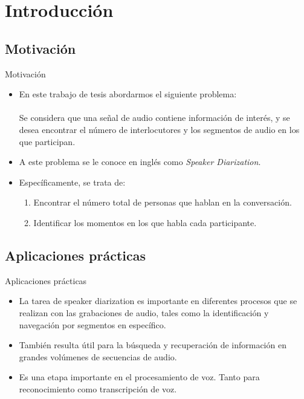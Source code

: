 

\section{Introducción}

\subsection{Motivación}
\begin{frame}{Motivación}

\begin{itemize}
    \itemsep1em
    \item En este trabajo de tesis abordarmos el siguiente problema: \\~\\
    \hspace{2em} Se considera que una señal de audio contiene información de interés, y se desea encontrar el número de interlocutores y los segmentos de audio en los que participan.

    \item A este problema se le conoce en inglés como \alert{\textit{Speaker Diarization}}.

    \item Específicamente, se trata de: 
    \begin{enumerate}
      \itemsep0.8em
        \item Encontrar el número total de personas que hablan en la conversación.
        \item Identificar los momentos en los que habla cada participante.
    \end{enumerate}
  \end{itemize}

\end{frame}

\subsection{Aplicaciones prácticas}

\begin{frame}{Aplicaciones prácticas}
  \begin{itemize}
    \itemsep1em
    \item  La tarea de speaker diarization es importante en diferentes procesos que se realizan con las grabaciones de audio, tales como la identificación y navegación por segmentos en específico.

    \item También resulta útil para la búsqueda y recuperación de información en grandes volúmenes de secuencias de audio.
  
    \item Es una etapa importante en el procesamiento de voz. Tanto para reconocimiento como transcripción de voz.
    
  \end{itemize}
\end{frame}

